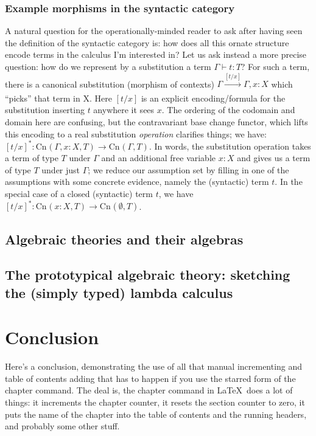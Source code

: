 \documentclass[12pt,twoside]{reedthesis}
\begin{document}
\newcommand{\clone}[3]{{\text{Cn}_{#1}(#2,#3)}}

\subsection{Example morphisms in the syntactic category}
A natural question for the operationally-minded reader to ask after having seen
the definition of the syntactic category is: how does all this ornate structure
encode terms in the calculus I'm interested in? Let us ask instead a more
precise question: how do we represent by a substitution a term \(\Gamma \vdash t : T\)?
For such a term, there is a canonical substitution (morphism of contexts)
\( \Gamma \xrightarrow[]{[t/x]} \Gamma,x:X \) which ``picks'' that term in X. Here $[t/x]$
is an explicit encoding/formula for the substitution inserting $t$ anywhere it
sees $x$. The ordering of the codomain and domain here are confusing, but the
contravariant base change functor, which lifts this encoding to a real
substitution \emph{operation} clarifies things; we have:
\( [t/x]^{*} : \clone{}{\Gamma, x:X}{T} \longrightarrow \clone{}{\Gamma}{T} \). In words, the
substitution operation takes a term of type $T$ under $\Gamma$ and an additional free
variable $x:X$ and gives us a term of type $T$ under just $\Gamma$; we reduce our
assumption set by filling in one of the assumptions with some concrete evidence,
namely the (syntactic) term $t$. In the special case of a closed (syntactic)
term $t$, we have \( [t/x]^{*} : \clone{}{x:X}{T} \longrightarrow \clone{}{\emptyset}{T}\).

\section{Algebraic theories and their algebras}
\section{The prototypical algebraic theory: sketching the (simply typed) lambda calculus}

\chapter*{Conclusion}
\setcounter{chapter}{4}
\setcounter{section}{0}

Here's a conclusion, demonstrating the use of all that manual incrementing and table of contents adding that has to happen if you use the starred form of the chapter command. The deal is, the chapter command in \LaTeX\ does a lot of things: it increments the chapter counter, it resets the section counter to zero, it puts the name of the chapter into the table of contents and the running headers, and probably some other stuff. 
\end{document}
